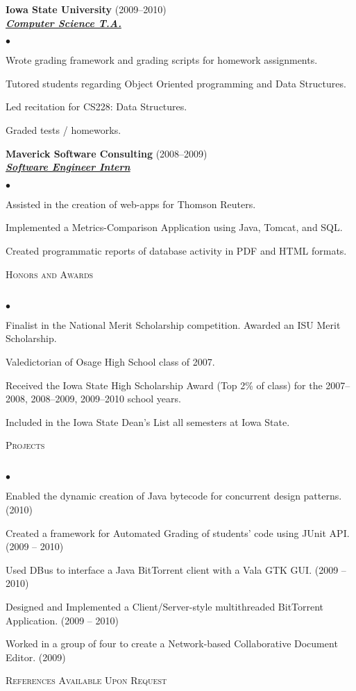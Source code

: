 \documentclass{article}
\newcommand{\lineunder} {
	\vspace*{-8pt} \\ \hspace*{-18pt} \hrulefill \\
}
\newcommand{\header}[1] {
	{\hspace*{-15pt}\vspace*{6pt} \textsc{#1}} \vspace*{-6pt} \lineunder
}
\newcommand{\employer}[3] {
	{ \textbf{#1} (#2)\\ \underline{\textbf{\emph{#3}}}\\  }
}
\newenvironment{achievements} {
	\begin{list}{$\bullet$}
		{\topsep 0pt \itemsep -2pt}
	}{
		\vspace*{4pt}\end{list}
	}
\begin{document}
	\employer{Iowa State University}{2009--2010}{Computer Science T.A.}
		\begin{achievements}
			\item{Wrote grading framework and grading scripts for homework assignments.}
			\item{Tutored students regarding Object Oriented programming and Data Structures.}
			\item{Led recitation for CS228: Data Structures.}
			\item{Graded tests / homeworks.}
		\end{achievements}

	\employer{Maverick Software Consulting}{2008--2009}{Software Engineer Intern}
		\begin{achievements}
			\item{Assisted in the creation of web-apps for Thomson Reuters.}
			\item{Implemented a Metrics-Comparison Application using Java, Tomcat, and SQL.}
			\item{Created programmatic reports of database activity in PDF and HTML formats.}
		\end{achievements}


\header{Honors and Awards}

	\begin{achievements}
		\item{Finalist in the National Merit Scholarship competition. Awarded an ISU Merit Scholarship.}
		\item{Valedictorian of Osage High School class of 2007.}
		\item{Received the Iowa State High Scholarship Award (Top 2\% of class) for the 2007--2008, 2008--2009, 2009--2010 school years.}
		\item{Included in the Iowa State Dean's List all semesters at Iowa State.}
	\end{achievements}

\header{Projects}

	\begin{achievements}
		\item{Enabled the dynamic creation of Java bytecode for concurrent design patterns. (2010)}
		\item{Created a framework for Automated Grading of students' code using JUnit API. (2009 -- 2010)}
		\item{Used DBus to interface a Java BitTorrent client with a Vala GTK GUI. (2009 -- 2010)}
		\item{Designed and Implemented a Client/Server-style multithreaded BitTorrent Application. (2009 -- 2010)}
		\item{Worked in a group of four to create a Network-based Collaborative Document Editor. (2009)}
	\end{achievements}

\header{References Available Upon Request}
\end{document}
